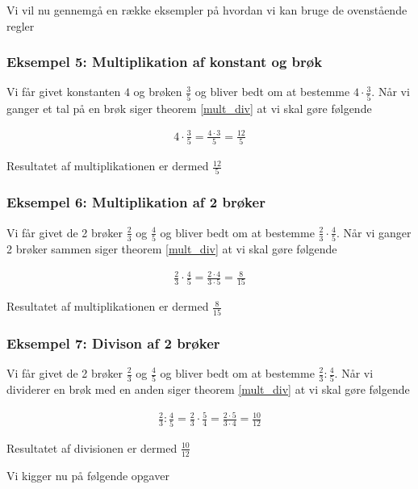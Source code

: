 Vi vil nu gennemgå en række eksempler på hvordan vi kan bruge de ovenstående regler

\subsubsection*{Eksempel 5: Multiplikation af konstant og brøk}

Vi får givet konstanten $4$ og brøken $\frac{3}{5}$ og bliver bedt om at bestemme $4\cdot \frac{3}{5}$. Når vi ganger et tal på en brøk siger theorem \ref{mult_div} at vi skal gøre følgende

\begin{align*}
4\cdot \frac{3}{5} = \frac{4\cdot 3}{5} = \frac{12}{5}
\end{align*}

Resultatet af multiplikationen er dermed $\frac{12}{5}$


\subsubsection*{Eksempel 6: Multiplikation af 2 brøker}

Vi får givet de 2 brøker $\frac{2}{3}$ og $\frac{4}{5}$ og bliver bedt om at bestemme $\frac{2}{3} \cdot \frac{4}{5}$. Når vi ganger 2 brøker sammen siger theorem \ref{mult_div} at vi skal gøre følgende

\begin{align*}
\frac{2}{3} \cdot \frac{4}{5} = \frac{2\cdot 4}{3\cdot 5} = \frac{8}{15}
\end{align*}

Resultatet af multiplikationen er dermed $\frac{8}{15}$

\subsubsection*{Eksempel 7: Divison af 2 brøker}

Vi får givet de 2 brøker $\frac{2}{3}$ og $\frac{4}{5}$ og bliver bedt om at bestemme $\frac{2}{3} : \frac{4}{5}$. Når vi dividerer en brøk med en anden siger theorem \ref{mult_div} at vi skal gøre følgende

\begin{align*}
\frac{2}{3} : \frac{4}{5} = \frac{2}{3} \cdot \frac{5}{4} = \frac{2\cdot 5}{3\cdot 4} = \frac{10}{12}
\end{align*}

Resultatet af divisionen er dermed $\frac{10}{12}$

Vi kigger nu på følgende opgaver


